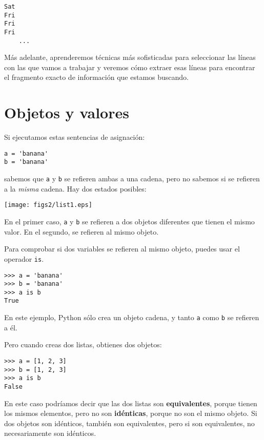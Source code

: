 \beforeverb
\begin{verbatim}
Sat
Fri
Fri
Fri
    ...
\end{verbatim}
\afterverb
%
Más adelante, aprenderemos técnicas más sofisticadas para
seleccionar las líneas con las que vamos a trabajar y veremos cómo extraer
esas líneas para encontrar el fragmento exacto de información
que estamos buscando.

\section{Objetos y valores}


Si ejecutamos estas sentencias de asignación:

\beforeverb
\begin{verbatim}
a = 'banana'
b = 'banana'
\end{verbatim}
\afterverb
%
sabemos que {\tt a} y {\tt b} se refieren ambas a una
cadena, pero no sabemos si se refieren a la
\emph{misma} cadena. Hay dos estados posibles:


\beforefig
\centerline{\texttt{[image: figs2/list1.eps]}}
\afterfig

En el primer caso, {\tt a} y {\tt b} se refieren a dos objetos diferentes que
tienen el mismo valor. En el segundo, se refieren al mismo
objeto.


Para comprobar si dos variables se refieren al mismo objeto, puedes
usar el operador {\tt is}.

\beforeverb
\begin{verbatim}
>>> a = 'banana'
>>> b = 'banana'
>>> a is b
True
\end{verbatim}
\afterverb
%
En este ejemplo, Python sólo crea un objeto cadena,
y tanto {\tt a} como {\tt b} se refieren a él.

Pero cuando creas dos listas, obtienes dos objetos:

\beforeverb
\begin{verbatim}
>>> a = [1, 2, 3]
>>> b = [1, 2, 3]
>>> a is b
False
\end{verbatim}
\afterverb
%

En este caso podríamos decir que las dos listas son {\bf equivalentes},
porque tienen los mismos elementos, pero no son {\bf idénticas}, porque
no son el mismo objeto. Si dos objetos son idénticos, también
son equivalentes, pero si son equivalentes, no necesariamente
son idénticos.

